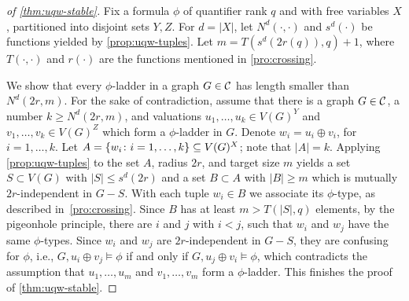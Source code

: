 \begin{proof}[of \cref{thm:uqw-stable}]
Fix a formula $\phi$ of quantifier rank $q$ and with free variables $X$, partitioned into disjoint sets $Y,Z$.
For $d=|X|$,
let $N^d(\cdot,\cdot)$ and $s^d(\cdot)$ be functions yielded by \cref{prop:uqw-tuples}.
Let $m=T(s^d(2r(q)),q)+1$, where $T(\cdot,\cdot)$ and $r(\cdot)$ are the functions mentioned in \cref{pro:crossing}.

We show that 
every $\phi$-ladder in a graph $G\in\cal C$ has length smaller than $N^d(2r,m)$. 
For the sake of contradiction, assume that there is a graph $G\in\cal C$, a number $k\ge N^d(2r,m)$,
and valuations $u_1,\ldots,u_k\in V(G)^Y$ and $ v_1,\ldots, v_k\in V(G)^Z$
which form a $\phi$-ladder in $G$.
Denote $w_i=u_i\oplus v_i$, for $i=1,\ldots,k$.
	Let $A=\set{ w_i\colon i=1,\ldots,k}\subset V(G)^X$; note that $|A|=k$.
Applying \cref{prop:uqw-tuples} to the set $A$, radius $2r$, and target size $m$
		 yields a set $S\subset V(G)$ with $|S|\le s^d(2r)$
	and a set $B\subset A$ with $|B|\geq m$ which is mutually $2r$-independent in $G-S$.
%
%
%
With each tuple $w_i\in B$ we associate its $\phi$-type, as described in~\cref{pro:crossing}.
Since $B$ has at least $m>T(|S|,q)$ elements, by
 the pigeonhole principle, there are $i$ and $j$ 
with $i<j$, such that $ w_i$ and $w_j$ have the same $\phi$-types. Since $w_i$ and $w_j$ are $2r$-independent in $G-S$, they are confusing for $\phi$, i.e., 
 $G,u_i\oplus v_j\models \phi$ 
 if and only if $G,u_j\oplus v_i\models \phi$, which contradicts the assumption that $u_1,\ldots, u_m$ and $ v_1,\ldots, v_m$ form a $\phi$-ladder.
 This finishes the proof of \cref{thm:uqw-stable}.
\end{proof}
